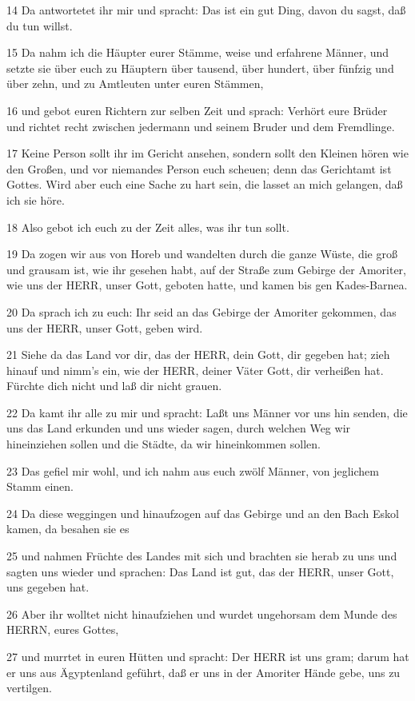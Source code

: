 \par 14 Da antwortetet ihr mir und spracht: Das ist ein gut Ding, davon du sagst, daß du tun willst.
\par 15 Da nahm ich die Häupter eurer Stämme, weise und erfahrene Männer, und setzte sie über euch zu Häuptern über tausend, über hundert, über fünfzig und über zehn, und zu Amtleuten unter euren Stämmen,
\par 16 und gebot euren Richtern zur selben Zeit und sprach: Verhört eure Brüder und richtet recht zwischen jedermann und seinem Bruder und dem Fremdlinge.
\par 17 Keine Person sollt ihr im Gericht ansehen, sondern sollt den Kleinen hören wie den Großen, und vor niemandes Person euch scheuen; denn das Gerichtamt ist Gottes. Wird aber euch eine Sache zu hart sein, die lasset an mich gelangen, daß ich sie höre.
\par 18 Also gebot ich euch zu der Zeit alles, was ihr tun sollt.
\par 19 Da zogen wir aus von Horeb und wandelten durch die ganze Wüste, die groß und grausam ist, wie ihr gesehen habt, auf der Straße zum Gebirge der Amoriter, wie uns der HERR, unser Gott, geboten hatte, und kamen bis gen Kades-Barnea.
\par 20 Da sprach ich zu euch: Ihr seid an das Gebirge der Amoriter gekommen, das uns der HERR, unser Gott, geben wird.
\par 21 Siehe da das Land vor dir, das der HERR, dein Gott, dir gegeben hat; zieh hinauf und nimm's ein, wie der HERR, deiner Väter Gott, dir verheißen hat. Fürchte dich nicht und laß dir nicht grauen.
\par 22 Da kamt ihr alle zu mir und spracht: Laßt uns Männer vor uns hin senden, die uns das Land erkunden und uns wieder sagen, durch welchen Weg wir hineinziehen sollen und die Städte, da wir hineinkommen sollen.
\par 23 Das gefiel mir wohl, und ich nahm aus euch zwölf Männer, von jeglichem Stamm einen.
\par 24 Da diese weggingen und hinaufzogen auf das Gebirge und an den Bach Eskol kamen, da besahen sie es
\par 25 und nahmen Früchte des Landes mit sich und brachten sie herab zu uns und sagten uns wieder und sprachen: Das Land ist gut, das der HERR, unser Gott, uns gegeben hat.
\par 26 Aber ihr wolltet nicht hinaufziehen und wurdet ungehorsam dem Munde des HERRN, eures Gottes,
\par 27 und murrtet in euren Hütten und spracht: Der HERR ist uns gram; darum hat er uns aus Ägyptenland geführt, daß er uns in der Amoriter Hände gebe, uns zu vertilgen.
